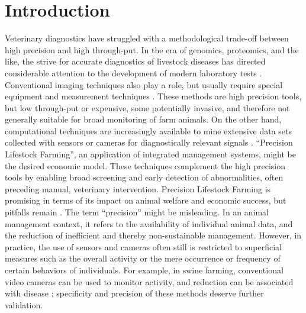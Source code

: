 \section{Introduction}
\label{intro_22}
Veterinary diagnostics have struggled with a methodological trade-off between high precision and high through-put.
In the era of genomics, proteomics, and the like, the strive for accurate diagnostics of livestock diseases has directed considerable attention to the development of modern laboratory tests \citep{Howson2017,Lamy2012}.
Conventional imaging techniques also play a role, but usually require special equipment and measurement techniques \citep[e.g. radiography, microscopy, ultrasound, \textit{cf.}][]{Yitbarek2022}.
These methods are high precision tools, but low through-put or expensive, some potentially invasive, and therefore not generally suitable for broad monitoring of farm animals.
On the other hand, computational techniques are increasingly available to mine extensive data sets collected with sensors or cameras for diagnostically relevant signals \citep{Neethirajan2020,Wurtz2019,Pineiro2019,Gomez2021,Netukova2021}.
``Precision Lifestock Farming'', an application of integrated management systems, might be the desired economic model.
These techniques complement the high precision tools by enabling broad screening and early detection of abnormalities, often preceding manual, veterinary intervention.
Precision Lifestock Farming is promising in terms of its impact on animal welfare and economic success, but pitfalls remain \citep{Wathes2008,Azarpajouh2020}.
The term ``precision'' might be misleading.
In an animal management context, it refers to the availability of individual animal data, and the reduction of inefficient and thereby non-sustainable management.
However, in practice, the use of sensors and cameras often still is restricted to superficial measures such as the overall activity or the mere occurrence or frequency of certain behaviors of individuals.
For example, in swine farming, conventional video cameras can be used to monitor activity, and reduction can be associated with disease \citep{FernandezCarrion2017,Benjamin2019,Vranken2017}; specificity and precision of these methods deserve further validation.



